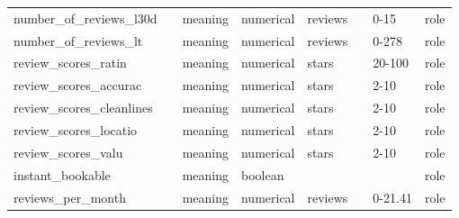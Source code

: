 \begin{center}
\begin{longtable}{@{}llllllll@{}}
number\_of\_reviews\_l30d   &                             & meaning                           & numerical   & reviews        &                             &                     0-15    & role \\
number\_of\_reviews\_lt     &                             & meaning                           & numerical   & reviews        &                             &                     0-278   & role \\
review\_scores\_ratin       &                             & meaning                           & numerical   & stars          &                             &                     20-100  & role \\
review\_scores\_accurac     &                             & meaning                           & numerical   & stars          &                             &                     2-10    & role \\
review\_scores\_cleanlines  &                             & meaning                           & numerical   & stars          &                             &                     2-10    & role \\
review\_scores\_locatio     &                             & meaning                           & numerical   & stars          &                             &                     2-10    & role \\
review\_scores\_valu        &                             & meaning                           & numerical   & stars          &                             &                     2-10    & role \\
instant\_bookable           &                             & meaning                           & boolean     &                &                             &                     & role \\
reviews\_per\_month         &                             & meaning                           & numerical   & reviews        &                             &                     0-21.41 & role \\ \bottomrule
\end{longtable}

\end{center}
